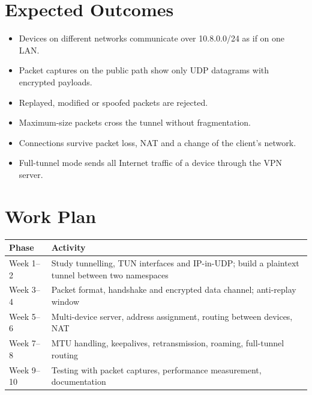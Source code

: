 \documentclass[12pt,a4paper]{article}
\begin{document}
\section{Expected Outcomes}
\begin{itemize}
  \item Devices on different networks communicate over 10.8.0.0/24 as if on one LAN.
  \item Packet captures on the public path show only UDP datagrams with encrypted payloads.
  \item Replayed, modified or spoofed packets are rejected.
  \item Maximum-size packets cross the tunnel without fragmentation.
  \item Connections survive packet loss, NAT and a change of the client's network.
  \item Full-tunnel mode sends all Internet traffic of a device through the VPN server.
\end{itemize}

\section{Work Plan}
\begin{tabularx}{\textwidth}{@{}lX@{}}
\toprule
\textbf{Phase} & \textbf{Activity}\\
\midrule
Week 1--2 & Study tunnelling, TUN interfaces and IP-in-UDP; build a plaintext tunnel between two namespaces\\
Week 3--4 & Packet format, handshake and encrypted data channel; anti-replay window\\
Week 5--6 & Multi-device server, address assignment, routing between devices, NAT\\
Week 7--8 & MTU handling, keepalives, retransmission, roaming, full-tunnel routing\\
Week 9--10 & Testing with packet captures, performance measurement, documentation\\
\bottomrule
\end{tabularx}
\end{document}
